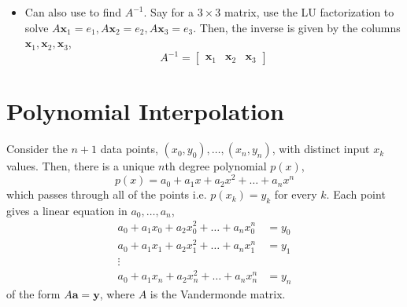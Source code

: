 \documentclass[letterpaper,12pt]{article}
\theoremstyle{definition}
\renewcommand{\vec}[1]{\mathbf{#1}}
\begin{document}
\begin{itemize}
    \item Can also use to find $A^{-1}$. Say for a $3 \times 3$ matrix, use the LU factorization to solve $A\vec{x}_1 = e_1, A\vec{x}_2 = e_2, A\vec{x}_3 = e_3$. Then, the inverse is given by the columns $\vec{x}_1, \vec{x}_2, \vec{x}_3$,
    \begin{equation*}
        A^{-1} = \begin{bmatrix} \vec{x}_1 & \vec{x}_2 & \vec{x}_3 \end{bmatrix}
    \end{equation*}
\end{itemize}


\section*{Polynomial Interpolation}
Consider the $n+1$ data points, $(x_0,y_0), \dots, (x_n,y_n)$, with distinct input $x_k$ values. Then, there is a unique $n$th degree polynomial $p(x)$,
\begin{equation*}
    p(x) = a_0 + a_1 x + a_2 x^2 + \dots + a_n x^n
\end{equation*}
which passes through all of the points i.e. $p(x_k) = y_k$ for every $k$. Each point gives a linear equation in $a_0, \dots, a_n$,
\begin{align*}
    a_0 + a_1 x_0 + a_2 x_0^2 + \dots + a_n x_0^n & = y_0 \\
    a_0 + a_1 x_1 + a_2 x_1^2 + \dots + a_n x_1^n & = y_1 \\
    \vdots & \\
    a_0 + a_1 x_n + a_2 x_n^2 + \dots + a_n x_n^n & = y_n
\end{align*}
of the form $A\vec{a} = \vec{y}$, where $A$ is the Vandermonde matrix.
\end{document}
